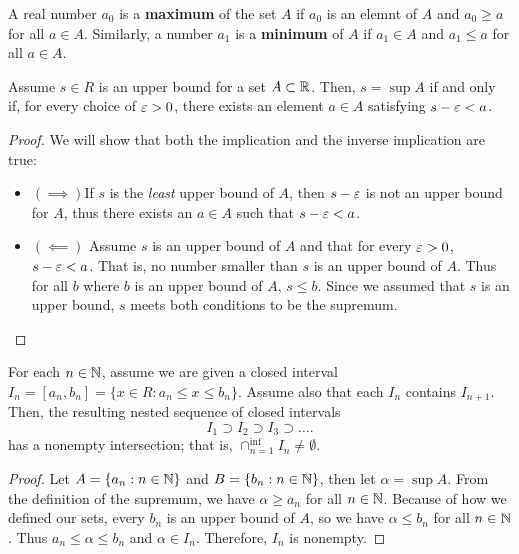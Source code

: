 \begin{definition}
	A real number $a_0$ is a \textbf{maximum} of the set $A$ if $a_0$ is an elemnt of $A$ and $a_0 \ge a$ for all $a \in A$. Similarly, a number $a_1$ is a \textbf{minimum} of $A$ if $a_1 \in A$ and $a_1 \le a$ for all $a \in A$.
\end{definition}


\begin{theorem}
	Assume $s \in R$ is an upper bound for a set $A \subset \mathbb{R}$. Then, $s = \sup A$ if and only if, for every choice of $\e > 0$, there exists an element $a \in A$ satisfying $s - \e < a$.
\end{theorem}

\begin{proof}
       	We will show that both the implication and the inverse implication are true:
	
	\begin{itemize}
		\item $\left( \implies \right) $If $s$ is the \textit{least} upper bound of $A$, then $s - \e$ is not an upper bound for $A $, thus there exists an  $a \in A$ such that $s - \e < a$.
		\item $\left( \impliedby \right) $ Assume $s$ is an upper bound of $A$ and that for every $\e > 0$, $s-\e <a$. That is, no number smaller than $s$ is an upper bound of $A$. Thus for all $b$ where $b$ is an upper bound of $A$, $s \le b$. Since we assumed that $s$ is an upper bound, $s$ meets both conditions to be the supremum. 
	\end{itemize}	
\end{proof}

\begin{theorem}
	For each $n \in \mathbb{N}$, assume we are given a closed interval $I_n = [a_n, b_n] = \{x \in R : a_n \le x\le b_n\}$. Assume also that each $I_n$ contains $I_{n+1}$. Then, the resulting nested sequence of closed intervals
	\[
	I_1 \supset I_2 \supset I_3 \supset \ldots
	.\] 
	has a nonempty intersection; that is, $\cap_{n=1}^{\inf} I_n \neq \emptyset$.
\end{theorem}

\begin{proof}
	Let $A = \{a_n : n \in \mathbb{N}\}$ and $B = \{b_n : n \in \mathbb{N}\}$, then let $\alpha = \sup A$. From the definition of the supremum, we have  $\alpha \ge a_n$ for all $n \in \mathbb{N}$. Because of how we defined our sets, every  $b_n$ is an upper bound of $A$, so we have $\alpha \le b_n$ for all $n \in \mathbb{N}$. Thus $a_n \le \alpha \le b_n$ and $\alpha \in I_n$. Therefore,  $I_n$ is nonempty.
\end{proof}

